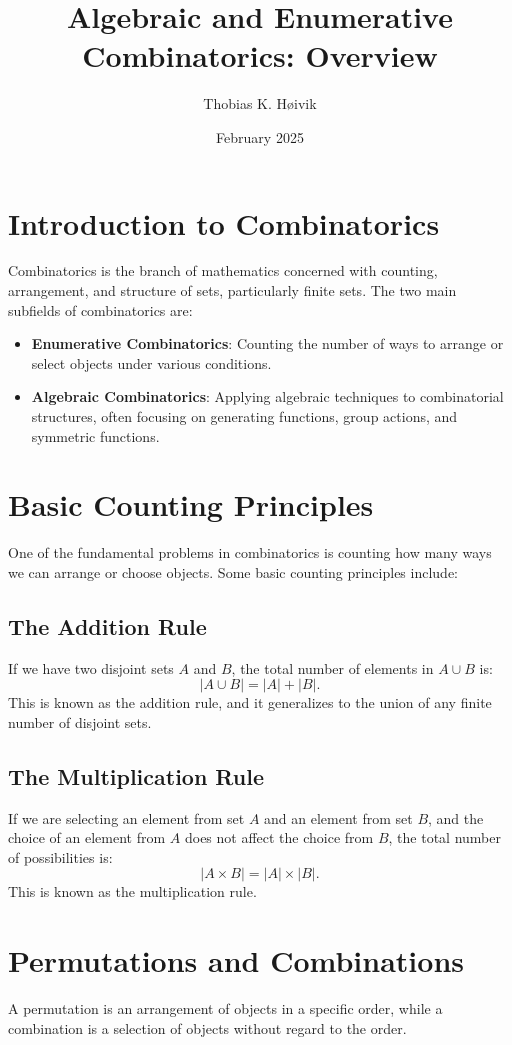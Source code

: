 \documentclass{article}
\title{Algebraic and Enumerative Combinatorics: Overview}
\author{Thobias K. Høivik}
\date{February 2025}
\begin{document}
\maketitle

\section{Introduction to Combinatorics}
Combinatorics is the branch of mathematics concerned with counting, arrangement, and structure of sets, particularly finite sets. The two main subfields of combinatorics are:

\begin{itemize}
    \item \textbf{Enumerative Combinatorics}: Counting the number of ways to arrange or select objects under various conditions.
    \item \textbf{Algebraic Combinatorics}: Applying algebraic techniques to combinatorial structures, often focusing on generating functions, group actions, and symmetric functions.
\end{itemize}

\section{Basic Counting Principles}
One of the fundamental problems in combinatorics is counting how many ways we can arrange or choose objects. Some basic counting principles include:

\subsection{The Addition Rule}
If we have two disjoint sets \( A \) and \( B \), the total number of elements in \( A \cup B \) is:
\[
|A \cup B| = |A| + |B|.
\]
This is known as the addition rule, and it generalizes to the union of any finite number of disjoint sets.

\subsection{The Multiplication Rule}
If we are selecting an element from set \( A \) and an element from set \( B \), and the choice of an element from \( A \) does not affect the choice from \( B \), the total number of possibilities is:
\[
|A \times B| = |A| \times |B|.
\]
This is known as the multiplication rule.

\section{Permutations and Combinations}
A permutation is an arrangement of objects in a specific order, while a combination is a selection of objects without regard to the order.
\end{document}
